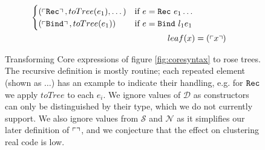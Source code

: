 \begin{figure}
\begin{align*}
\begin{cases}
      (\left\ulcorner \texttt{Rec} \right\urcorner,     toTree(e_1), \dots)                         & \text{if $e = \texttt{Rec}\ e_1 \dots$} \\
      (\left\ulcorner \texttt{Bind} \right\urcorner,    toTree(e_1))                                & \text{if $e = \texttt{Bind}\ l_1 e_1$}
    \end{cases} \\
    leaf(x) &= (\left\ulcorner x \right\urcorner)
  \end{align*}
  \caption{Transforming Core expressions of figure \ref{fig:coresyntax} to rose trees. The recursive definition is mostly routine; each repeated element (shown as $\dots$) has an example to indicate their handling, e.g. for $\texttt{Rec}$ we apply $toTree$ to each $e_i$. We ignore values of $\mathcal{D}$ as constructors can only be distinguished by their type, which we do not currently support. We also ignore values from $\mathcal{S}$ and $\mathcal{N}$ as it simplifies our later definition of $\left\ulcorner  \right\urcorner$, and we conjecture that the effect on clustering real code is low.}
  \label{fig:totree}
\end{figure}

